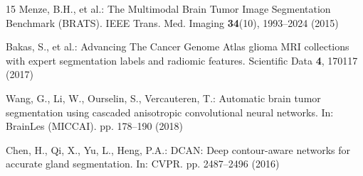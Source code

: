 \documentclass[runningheads]{llncs}
\begin{document}
\begin{thebibliography}{15}
Menze, B.H., et al.: The Multimodal Brain Tumor Image Segmentation Benchmark (BRATS). IEEE Trans. Med. Imaging \textbf{34}(10), 1993--2024 (2015)

Bakas, S., et al.: Advancing The Cancer Genome Atlas glioma MRI collections with expert segmentation labels and radiomic features. Scientific Data \textbf{4}, 170117 (2017)

Wang, G., Li, W., Ourselin, S., Vercauteren, T.: Automatic brain tumor segmentation using cascaded anisotropic convolutional neural networks. In: BrainLes (MICCAI). pp. 178--190 (2018)

Chen, H., Qi, X., Yu, L., Heng, P.A.: DCAN: Deep contour-aware networks for accurate gland segmentation. In: CVPR. pp. 2487--2496 (2016)
\end{thebibliography}
\end{document}
